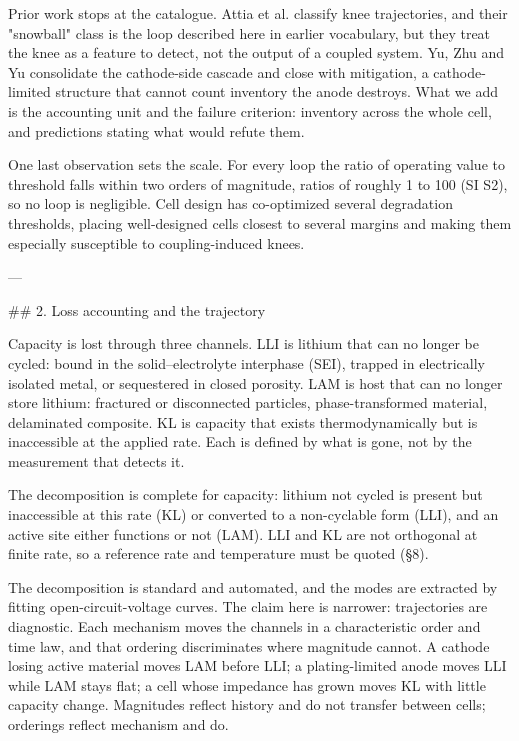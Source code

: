 Prior work stops at the catalogue. Attia et al. classify knee trajectories, and their "snowball" class is the loop described here in earlier vocabulary, but they treat the knee as a feature to detect, not the output of a coupled system.\cite{attia2022review} Yu, Zhu and Yu consolidate the cathode-side cascade and close with mitigation, a cathode-limited structure that cannot count inventory the anode destroys.\cite{yu2026degradation} What we add is the accounting unit and the failure criterion: inventory across the whole cell, and predictions stating what would refute them.\cite{raj2020investigation}

One last observation sets the scale. For every loop the ratio of operating value to threshold falls within two orders of magnitude, ratios of roughly 1 to 100 (SI S2), so no loop is negligible. Cell design has co-optimized several degradation thresholds, placing well-designed cells closest to several margins and making them especially susceptible to coupling-induced knees.

---

## 2. Loss accounting and the trajectory

Capacity is lost through three channels. LLI is lithium that can no longer be cycled: bound in the solid--electrolyte interphase (SEI), trapped in electrically isolated metal, or sequestered in closed porosity. LAM is host that can no longer store lithium: fractured or disconnected particles, phase-transformed material, delaminated composite. KL is capacity that exists thermodynamically but is inaccessible at the applied rate. Each is defined by what is gone, not by the measurement that detects it.\cite{birkl2017degradation}

The decomposition is complete for capacity: lithium not cycled is present but inaccessible at this rate (KL) or converted to a non-cyclable form (LLI), and an active site either functions or not (LAM). LLI and KL are not orthogonal at finite rate, so a reference rate and temperature must be quoted (\S8).

The decomposition is standard and automated,\cite{mndezcorbacho2024dest} and the modes are extracted by fitting open-circuit-voltage curves.\cite{dubarry2012synthesize} The claim here is narrower: trajectories are diagnostic. Each mechanism moves the channels in a characteristic order and time law, and that ordering discriminates where magnitude cannot. A cathode losing active material moves LAM before LLI; a plating-limited anode moves LLI while LAM stays flat; a cell whose impedance has grown moves KL with little capacity change. Magnitudes reflect history and do not transfer between cells; orderings reflect mechanism and do.

